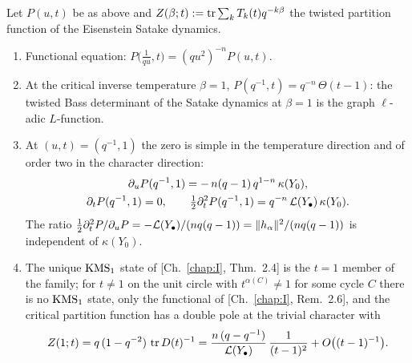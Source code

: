 \begin{theorem}\label{IX:thm:crit}
Let $P(u,t)$ be as above and $Z(\beta;t):=\operatorname{tr}\sum_kT_k(t)q^{-k\beta}$ the twisted
partition function of the Eisenstein Satake dynamics.
\begin{enumerate}
\item[(i)] Functional equation: $P\bigl(\tfrac1{qu},t\bigr)=(qu^{2})^{-n}P(u,t)$.
\item[(ii)] At the critical inverse temperature $\beta=1$,
$P(q^{-1},t)=q^{-n}\,\Theta(t-1)$: the twisted Bass determinant of the Satake dynamics
at $\beta=1$ is the graph $\ell$-adic $L$-function.
\item[(iii)] At $(u,t)=(q^{-1},1)$ the zero is simple in the temperature direction and
of order two in the character direction:
\begin{gather*}
\partial_uP(q^{-1},1)=-\,n(q-1)\,q^{1-n}\,\kappa(Y_0),\\
\partial_tP(q^{-1},1)=0,\qquad
\tfrac12\partial_t^{2}P(q^{-1},1)=q^{-n}\,\mathcal{L}(Y_\bullet)\,\kappa(Y_0) .
\end{gather*}
The ratio $\tfrac12\partial_t^{2}P/\partial_uP=-\mathcal{L}(Y_\bullet)/(nq(q-1))
=\|h_\alpha\|^{2}/(nq(q-1))$ is independent of $\kappa(Y_0)$.
\item[(iv)] The unique $\mathrm{KMS}_1$ state of {\rm[Ch.~\ref{chap:I}, Thm.~2.4]} is the $t=1$ member of the
family; for $t\neq1$ on the unit circle with $t^{\alpha(C)}\neq1$ for some cycle $C$
there is no $\mathrm{KMS}_1$ state, only the functional of {\rm[Ch.~\ref{chap:I}, Rem.~2.6]}, and the critical
partition function has a double pole at the trivial character with
\[
Z(1;t)=q\,(1-q^{-2})\,\operatorname{tr} D(t)^{-1}
=\frac{n\,(q-q^{-1})}{\mathcal{L}(Y_\bullet)}\,\frac1{(t-1)^{2}}+O\bigl((t-1)^{-1}\bigr).
\]
\end{enumerate}
\end{theorem}

